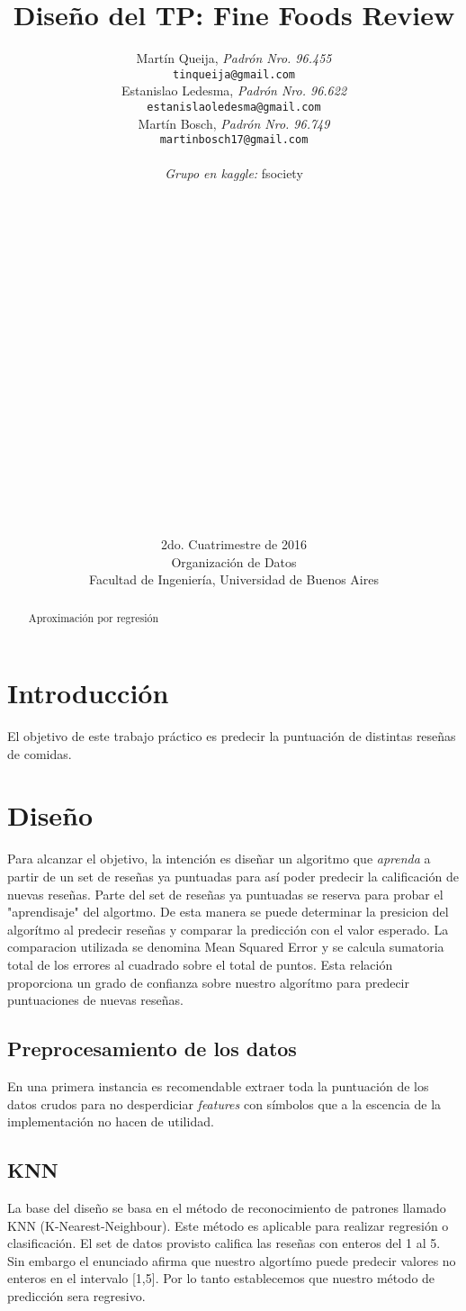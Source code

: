 \documentclass[a4paper,10pt]{article}
\title{	\textbf{Dise\~{n}o del TP: Fine Foods Review} }
\author{
    Mart\'{i}n Queija, \textit{Padr\'{o}n Nro. 96.455} \\
	\texttt{ tinqueija@gmail.com } \\[2.5ex]
	Estanislao Ledesma, \textit{Padr\'{o}n Nro. 96.622} \\
	\texttt{ estanislaoledesma@gmail.com } \\[2.5ex]
	Mart\'{i}n Bosch, \textit{Padr\'{o}n Nro. 96.749} \\
	\texttt{ martinbosch17@gmail.com } \\[2.5ex]
	\\
	\textit{Grupo en kaggle:} fsociety \\
	\\
	\\
	\\
	\\
	\\
	\\
	\\
	\\
	\\
	\\
	\\
	\\
	\\
	\\
	\\
	\\
	\\
	\\
	\\
	\\
	\normalsize{2do. Cuatrimestre de 2016} \\
	\normalsize{ Organizaci\'{o}n de Datos } \\
	\normalsize{ Facultad de Ingenier\'{i}a, Universidad de Buenos Aires } \\
}
\date{}
\begin{document}
	\maketitle
	\thispagestyle{empty}   %


	\begin{abstract}
		\centerline{Aproximaci\'{o}n por regresi\'{o}n}
		
	\end{abstract}
	\newpage
	
	\tableofcontents
	
	
	\section{Introducci\'{o}n}
	
	El objetivo de este trabajo pr\'{a}ctico es predecir la puntuaci\'{o}n de distintas rese\~{n}as de comidas.
	
	\section{Dise\~{n}o}
	
	Para alcanzar el objetivo, la intenci\'{o}n es dise\~{n}ar un algoritmo que \textit{aprenda} a partir de un set de rese\~{n}as ya puntuadas para as\'{i} poder predecir la calificaci\'{o}n de nuevas rese\~{n}as. Parte del set de rese\~{n}as ya puntuadas se reserva para probar el "aprendisaje" del algortmo. De esta manera se puede determinar la presicion del algor\'{i}tmo al predecir rese\~{n}as y comparar la predicci\'{o}n con el valor esperado. La comparacion utilizada se denomina Mean Squared Error y se calcula sumatoria total de los errores al cuadrado sobre el total de puntos. Esta relaci\'{o}n proporciona un grado de confianza sobre nuestro algor\'{i}tmo para predecir puntuaciones de nuevas rese\~{n}as.
	
	
	\subsection{Preprocesamiento de los datos}	
	En una primera instancia es recomendable extraer toda la puntuaci\'{o}n de los datos crudos para no desperdiciar \textit{features} con s\'{i}mbolos que a la escencia de la implementaci\'{o}n no hacen de utilidad.
	
	\subsection{KNN}
	La base del dise\~{n}o se basa en el m\'{e}todo de reconocimiento de patrones llamado KNN (K-Nearest-Neighbour). Este m\'{e}todo es aplicable para realizar regresi\'{o}n o clasificaci\'{o}n. El set de datos provisto califica las rese\~{n}as con enteros del 1 al 5. Sin embargo el enunciado afirma que nuestro algort\'{i}mo puede predecir valores no enteros en el intervalo [1,5]. Por lo tanto establecemos que nuestro m\'{e}todo de predicci\'{o}n sera regresivo.
	
\end{document}
